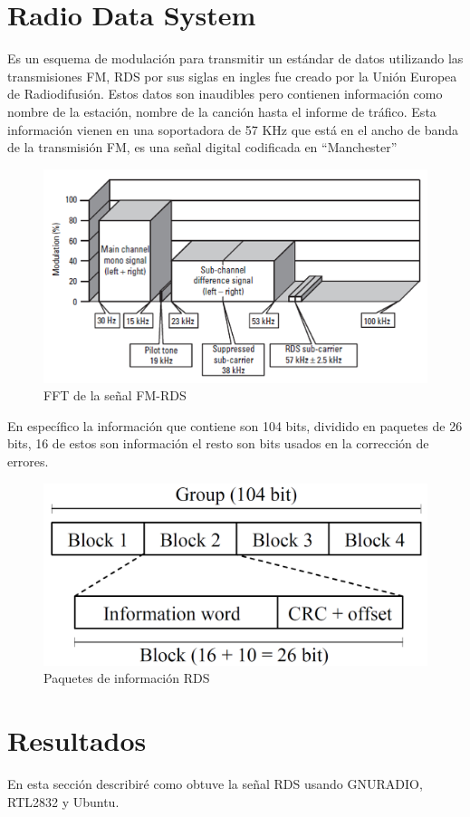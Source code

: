 \documentclass[preprint,12pt]{elsarticle}
\begin{document}
%

%

\section{Radio Data System}
\label{S:2}

Es un esquema de modulación para transmitir un estándar de datos utilizando las transmisiones FM, RDS por sus siglas en ingles fue creado por la Unión Europea de Radiodifusión. Estos datos son inaudibles pero contienen información como nombre de la estación, nombre de la canción hasta el informe de tráfico. Esta información vienen en una soportadora de 57 KHz que está en el ancho de banda de la transmisión FM, es una señal digital codificada en “Manchester”


\begin{figure}[htbp!]
\centering\includegraphics[width=0.4\linewidth]{fftRDS.png}
\caption{FFT de la señal FM-RDS}
\label{freqRDS}
\end{figure}
En específico la información que contiene son 104 bits, dividido en paquetes de 26 bits, 16 de estos son información el resto son bits usados en la corrección de errores.
\begin{figure}[h]
\centering\includegraphics[width=0.4\linewidth]{RDSPack.png}
\caption{Paquetes de información RDS}
\end{figure}

\section{Resultados}
\label{S:3}
En esta sección describiré como obtuve la señal RDS usando GNURADIO, RTL2832 y Ubuntu.
\end{document}
